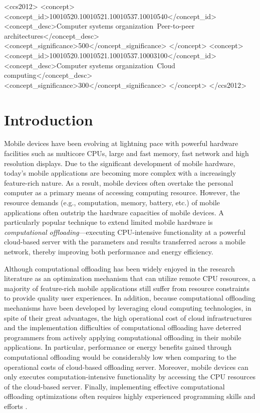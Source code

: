 \documentclass{sig-alternate}[10pt]
\begin{document}
\begin{CCSXML}
\begin{CCSXML}
<ccs2012>
<concept>
<concept_id>10010520.10010521.10010537.10010540</concept_id>
<concept_desc>Computer systems organization~Peer-to-peer architectures</concept_desc>
<concept_significance>500</concept_significance>
</concept>
<concept>
<concept_id>10010520.10010521.10010537.10003100</concept_id>
<concept_desc>Computer systems organization~Cloud computing</concept_desc>
<concept_significance>300</concept_significance>
</concept>
</ccs2012>
\end{CCSXML}


\printccsdesc
{}

\section{Introduction}
Mobile devices have been evolving at lightning pace with powerful hardware facilities such as multicore CPUs, large and fast memory, fast network and high resolution displays. Due to the significant development of mobile hardware, today's mobile applications are becoming more complex with a increasingly feature-rich nature. As a result, mobile devices often overtake the personal computer as a primary means of accessing computing resource. However, the resource demands (e.g., computation, memory, battery, etc.) of mobile applications often outstrip the hardware capacities of mobile devices. A particularly popular technique to extend limited mobile hardware is \emph{computational offloading}---executing CPU-intensive functionality at a powerful cloud-based server with the parameters and results transferred across a mobile network, thereby improving both performance and energy efficiency. 

Although computational offloading has been widely enjoyed in the research literature as an optimization mechanism that can utilize remote CPU resources, a majority of feature-rich mobile applications still suffer from resource constraints to provide quality user experiences. In addition, because computational offloading mechanisms have been developed by leveraging cloud computing technologies, in spite of their great advantages, the high operational cost of cloud infrastructures and the implementation difficulties of computational offloading have deterred programmers from actively applying computational offloading in their mobile applications. In particular, performance or energy benefits gained through computational offloading would be considerably low when comparing to the operational costs of cloud-based offloading server. Moreover, mobile devices can only executes computation-intensive functionality by accessing the CPU resources of the cloud-based server. Finally, implementing effective computational offloading optimizations often requires highly experienced programming skills and efforts \cite{kwon+:mobilesoft15}.


\end{CCSXML}
\end{document}
